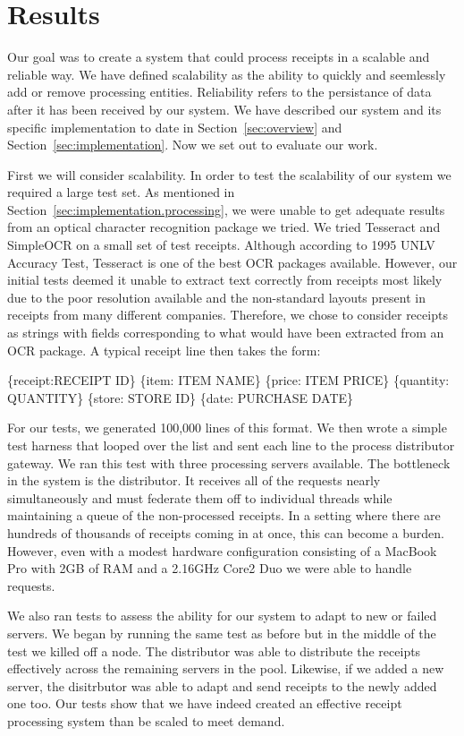 \section{Results}
\label{sec:results}

Our goal was to create a system that could process receipts in a
scalable and reliable way. We have defined scalability as the ability
to quickly and seemlessly add or remove processing
entities. Reliability refers to the persistance of data after it has
been received by our system. We have described our system and its
specific implementation to date in Section~\ref{sec:overview} and
Section~\ref{sec:implementation}. Now we set out to evaluate our work.

First we will consider scalability. In order to test the scalability
of our system we required a large test set. As mentioned in
Section~\ref{sec:implementation.processing}, we were unable to get
adequate results from an optical character recognition package we
tried. We tried Tesseract and SimpleOCR on a small set of test
receipts. Although according to 1995 UNLV Accuracy Test, Tesseract is
one of the best OCR packages available. However, our initial tests
deemed it unable to extract text correctly from receipts most likely
due to the poor resolution available and the non-standard layouts
present in receipts from many different companies. Therefore, we chose to consider receipts as strings with fields corresponding to what would have been extracted from an OCR package. A typical receipt line then takes the form:

\begin{centering}
\{receipt:RECEIPT ID\} \{item: ITEM NAME\} \{price: ITEM PRICE\} \{quantity: QUANTITY\} \{store: STORE ID\} \{date: PURCHASE DATE\}
\end{centering}

For our tests, we generated 100,000 lines of this format. We then
wrote a simple test harness that looped over the list and sent each
line to the process distributor gateway. We ran this test with three
processing servers available. The bottleneck in the system is the
distributor. It receives all of the requests nearly simultaneously and
must federate them off to individual threads while maintaining a queue
of the non-processed receipts. In a setting where there are hundreds
of thousands of receipts coming in at once, this can become a
burden. However, even with a modest hardware configuration consisting
of a MacBook Pro with 2GB of RAM and a 2.16GHz Core2 Duo we were able
to handle  requests. 

We also ran tests to assess the ability for our system to adapt to new
or failed servers. We began by running the same test as before but in
the middle of the test we killed off a node. The distributor was able
to distribute the receipts effectively across the remaining servers in
the pool. Likewise, if we added a new server, the disitrbutor was able
to adapt and send receipts to the newly added one too. Our tests show
that we have indeed created an effective receipt processing system
than be scaled to meet demand.